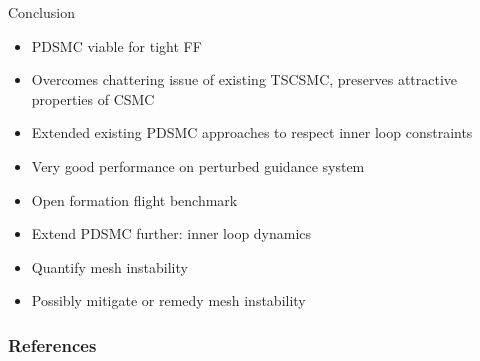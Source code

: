 \documentclass[12pt,svgnames,table,draft=false]{beamer}
\begin{document}
\begin{frame}{Conclusion}

\begin{tcolorbox}[width=.99\textwidth,
colback={blue!10!},
standard jigsaw,
opacityback=1,  %
]  
\begin{itemize}
\item PDSMC viable for tight FF
\item Overcomes chattering issue of existing TSCSMC, preserves attractive properties of CSMC
\item Extended existing PDSMC approaches to respect inner loop constraints \cite{Bolting2016}
\item Very good performance on perturbed guidance system
\item Open formation flight benchmark
\end{itemize}
\end{tcolorbox}


\begin{tcolorbox}[width=.99\textwidth,
colback={red!10!},
standard jigsaw,
opacityback=1,  %
]  
\begin{itemize}
\item Extend PDSMC further: inner loop dynamics
\item Quantify mesh instability
\item Possibly mitigate or remedy mesh instability
\end{itemize}
\end{tcolorbox}

\end{frame}


\begin{frame}
\end{frame}

\usebackgroundtemplate{}

\frametitle{References}


        
%  
\end{document}
